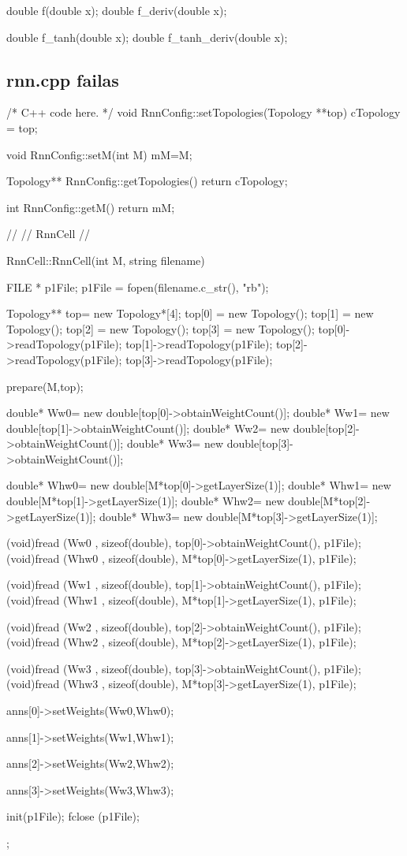 double f(double x);
double f\_deriv(double x);

double f\_tanh(double x);
double f\_tanh\_deriv(double x);



\subsection{rnn.cpp failas}

/* C++ code here. */
void RnnConfig::setTopologies(Topology **top){
  cTopology = top;
}

void RnnConfig::setM(int M){
  mM=M;
}


Topology** RnnConfig::getTopologies(){
  return cTopology;
}

int RnnConfig::getM(){
  return mM;
}


//
// RnnCell
//

RnnCell::RnnCell(int M, string filename) {
  FILE * p1File;
  p1File = fopen(filename.c\_str(), "rb");

  Topology** top= new Topology*[4];
  top[0] = new Topology();
  top[1] = new Topology();
  top[2] = new Topology();
  top[3] = new Topology();
  top[0]->readTopology(p1File);
  top[1]->readTopology(p1File);
  top[2]->readTopology(p1File);
  top[3]->readTopology(p1File);


  prepare(M,top);

  double* Ww0= new double[top[0]->obtainWeightCount()];
  double* Ww1= new double[top[1]->obtainWeightCount()];
  double* Ww2= new double[top[2]->obtainWeightCount()];
  double* Ww3= new double[top[3]->obtainWeightCount()];

  double* Whw0= new double[M*top[0]->getLayerSize(1)];
  double* Whw1= new double[M*top[1]->getLayerSize(1)];
  double* Whw2= new double[M*top[2]->getLayerSize(1)];
  double* Whw3= new double[M*top[3]->getLayerSize(1)];

  (void)fread (Ww0 , sizeof(double), top[0]->obtainWeightCount(), p1File);
  (void)fread (Whw0 , sizeof(double), M*top[0]->getLayerSize(1), p1File);

  (void)fread (Ww1 , sizeof(double), top[1]->obtainWeightCount(), p1File);
  (void)fread (Whw1 , sizeof(double), M*top[1]->getLayerSize(1), p1File);

  (void)fread (Ww2 , sizeof(double), top[2]->obtainWeightCount(), p1File);
  (void)fread (Whw2 , sizeof(double), M*top[2]->getLayerSize(1), p1File);

  (void)fread (Ww3 , sizeof(double), top[3]->obtainWeightCount(), p1File);
  (void)fread (Whw3 , sizeof(double), M*top[3]->getLayerSize(1), p1File);


  anns[0]->setWeights(Ww0,Whw0);

  anns[1]->setWeights(Ww1,Whw1);

  anns[2]->setWeights(Ww2,Whw2);

  anns[3]->setWeights(Ww3,Whw3);



  init(p1File);
  fclose (p1File);
};


